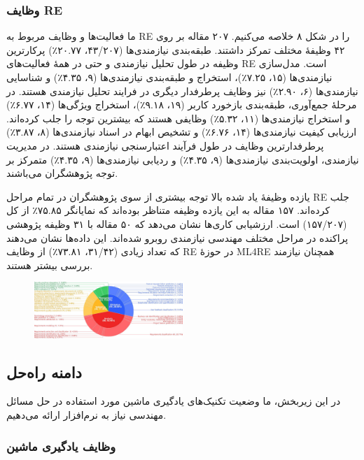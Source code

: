 \documentclass[a4paper,10pt]{article}
\begin{document}
            \subsubsection{وظایف RE}

                ما فعالیت‌ها و وظایف مربوط به RE را در شکل ۸ خلاصه می‌کنیم. ۲۰۷ مقاله بر روی ۴۲ وظیفهٔ مختلف تمرکز داشتند. طبقه‌بندی نیازمندی‌ها (۴۳/۲۰۷، ۲۰.۷۷٪) پرکارترین وظیفه در طول تحلیل نیازمندی و حتی در همهٔ فعالیت‌های RE است. مدل‌سازی نیازمندی‌ها (۱۵، ۷.۲۵٪)، استخراج و طبقه‌بندی نیازمندی‌ها (۹، ۴.۳۵٪) و شناسایی نیازمندی‌ها (۶، ۲.۹۰٪) نیز وظایف پرطرفدار دیگری در فرایند تحلیل نیازمندی هستند. در مرحلهٔ جمع‌آوری، طبقه‌بندی بازخورد کاربر (۱۹، ۹.۱۸٪)، استخراج ویژگی‌ها (۱۴، ۶.۷۷٪) و استخراج نیازمندی‌ها (۱۱، ۵.۳۲٪) وظایفی هستند که بیشترین توجه را جلب کرده‌اند. ارزیابی کیفیت نیازمندی‌ها (۱۴، ۶.۷۶٪) و تشخیص ابهام در اسناد نیازمندی‌ها (۸، ۳.۸۷٪) پرطرفدارترین وظایف در طول فرآیند اعتبارسنجی نیازمندی هستند. در مدیریت نیازمندی، اولویت‌بندی نیازمندی‌ها (۹، ۴.۳۵٪) و ردیابی نیازمندی‌ها (۹، ۴.۳۵٪) متمرکز بر توجه پژوهشگران می‌باشند.

                یازده وظیفهٔ یاد شده بالا توجه بیشتری از سوی پژوهشگران در تمام مراحل RE جلب کرده‌اند. ۱۵۷ مقاله به این یازده وظیفه متناظر بوده‌اند که نمایانگر ۷۵.۸۵٪ از کل (۱۵۷/۲۰۷) است. ارزشیابی کاری‌ها نشان می‌دهد که ۵۰ مقاله با ۳۱ وظیفه پژوهشی پراکنده در مراحل مختلف مهندسی نیازمندی روبرو شده‌اند. این داده‌ها نشان می‌دهند که تعداد زیادی (۳۱/۴۲، ۷۳.۸۱٪) از وظایف RE در حوزهٔ ML4RE همچنان نیازمند بررسی بیشتر هستند.

                \begin{figure}
                    \centering
                    \includegraphics[width=0.5\textwidth]{Image/fig-8.jpg}
                \end{figure}

            
        \subsection{دامنه راه‌حل}
        
            در این زیربخش، ما وضعیت تکنیک‌های یادگیری ماشین مورد استفاده در حل مسائل مهندسی نیاز به نرم‌افزار ارائه می‌دهیم.

            \subsubsection{وظایف یادگیری ماشین}
\end{document}
